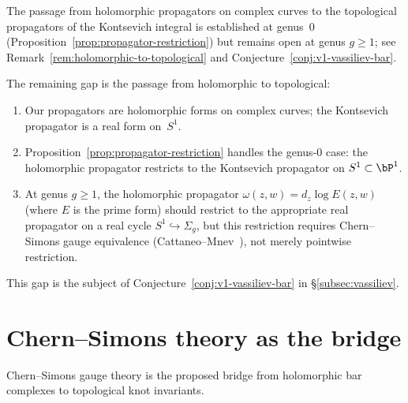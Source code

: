 \begin{remark}
The passage from holomorphic propagators on complex curves to the
topological propagators of the Kontsevich integral is established at
genus~$0$ \textup{(}Proposition~\ref{prop:propagator-restriction}\textup{)}
but remains open at genus \(g \geq 1\); see
Remark~\ref{rem:holomorphic-to-topological} and
Conjecture~\ref{conj:v1-vassiliev-bar}.
\end{remark}

\begin{remark}
\label{rem:holomorphic-to-topological}
The remaining gap is the passage from holomorphic to topological:
\begin{enumerate}
\item Our propagators are holomorphic forms on complex curves;
 the Kontsevich propagator is a real form on~$S^1$.
\item Proposition~\ref{prop:propagator-restriction} handles the
 genus-$0$ case: the holomorphic propagator restricts to the
 Kontsevich propagator on $S^1 \subset \bP^1$.
\item At genus $g \geq 1$, the holomorphic propagator
 $\omega(z,w) = d_z \log E(z,w)$ (where $E$ is the prime form)
 should restrict to the appropriate real propagator on a real
 cycle $S^1 \hookrightarrow \Sigma_g$, but this restriction
 requires Chern--Simons gauge equivalence
 (Cattaneo--Mnev~\cite{CattaneoMnev10}), not merely
 pointwise restriction.
\end{enumerate}
This gap is the subject of Conjecture~\ref{conj:v1-vassiliev-bar}
in \S\ref{subsec:vassiliev}.
\end{remark}


\section{Chern--Simons theory as the bridge}
\label{sec:cs-bridge}
Chern--Simons gauge theory is the proposed bridge from holomorphic bar
complexes to topological knot invariants.


